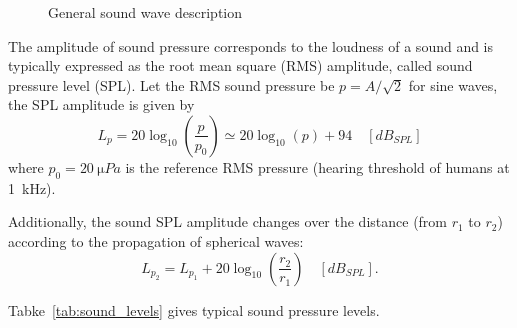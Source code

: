 \documentclass{EPL-master-thesis-covers-EN}
\begin{document}
\begin{figure}[H]
\centering
{}
\caption{General sound wave description}
\label{fig:sound_wave}
\end{figure}

The amplitude of sound pressure corresponds to the loudness of a sound and is typically expressed as the root mean square (RMS) amplitude, called sound
pressure level (SPL). Let the RMS sound pressure be $p=A/\sqrt{2}$ for sine waves, the SPL amplitude is given by
\[
 L_p = 20\log_{10}\left(\frac{p}{p_0}\right) \simeq 20\log_{10}(p) + 94 \quad [\si{dB_{SPL}}]
\]
where $p_0=\SI{20}{\micro Pa}$ is the reference RMS pressure (hearing threshold of humans at \SI{1}{kHz}).

Additionally, the sound SPL amplitude changes over the distance (from $r_1$ to $r_2$) according to the propagation of spherical waves:
\[
 L_{p_2} = L_{p_1} + 20\log_{10}\left(\frac{r_2}{r_1}\right) \quad [\si{dB_{SPL}}].
\]

Tabke~\ref{tab:sound_levels} gives typical sound pressure levels.

\begin{table}[H]
\centering
{}
\caption{Typical sound pressure levels}
\label{tab:sound_levels}
\end{table}
\end{document}

